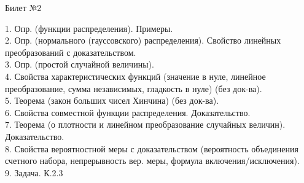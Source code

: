 \documentclass[preview]{standalone}
\begin{document}
 
\begin{center} {\Large Билет №2} \end{center} 

1.  Опр. (функции распределения). Примеры.\\

2.  Опр. (нормального (гауссовского) распределения). Свойство линейных преобразований с доказательством.\\

3.  Опр. (простой случайной величины).\\

4.  Свойства характеристических функций (значение в нуле, линейное преобразование, сумма независимых, гладкость в нуле) (без док-ва).\\

5.  Теорема (закон больших чисел Хинчина) (без док-ва).\\

6.  Свойства совместной функции распределения. Доказательство.\\

7.  Теорема (о плотности и линейном преобразование случайных величин). Доказательство.\\

8.  Свойства  вероятностной меры с доказательством (вероятность объединения счетного набора, непрерывность вер. меры, формула включения/исключения).\\

9. Задача. К.2.3\\
\end{document}
